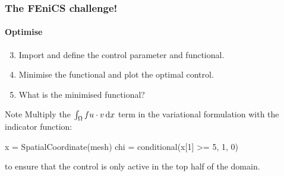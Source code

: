 \begin{frame}[fragile]
    \frametitle{The FEniCS challenge!}
    \framesubtitle{Optimise}

    \begin{enumerate}
        \setcounter{enumi}{2}
        \item Import  and define the control parameter and
          functional.
        \item Minimise the functional and plot the optimal control.
        \item What is the minimised functional?
    \end{enumerate}

    \begin{block}{Note}
      Multiply the $\int_\Omega fu\cdot v\, \mathrm{d}x$ term in the variational
      formulation with the indicator function:
      \vspace{-1em}
      \begin{python}
x = SpatialCoordinate(mesh)
chi = conditional(x[1] >= 5, 1, 0)
      \end{python}
      to ensure that the control is only active in the top half of the
      domain.
    \end{block}

\end{frame}
